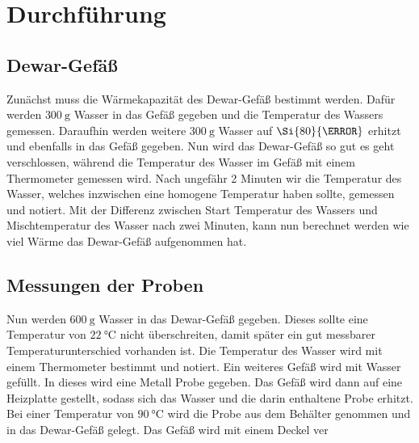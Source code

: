 \section{Durchführung}
\label{sec:Durchführung}

\subsection{Dewar-Gefäß}
Zunächst muss die Wärmekapazität des Dewar-Gefäß bestimmt werden.
Dafür werden $\SI{300}{\gram}$ Wasser in das Gefäß gegeben und die Temperatur des Wassers gemessen.
Daraufhin werden weitere $\SI{300}{\gram}$ Wasser auf $\Si{80}{\celsius}$ erhitzt und ebenfalls in das Gefäß gegeben.
Nun wird das Dewar-Gefäß so gut es geht verschlossen, während die Temperatur des Wasser im Gefäß mit einem Thermometer gemessen wird.
Nach ungefähr 2 Minuten wir die Temperatur des Wasser, welches inzwischen eine homogene Temperatur haben sollte, gemessen und notiert.
Mit der Differenz zwischen Start Temperatur des Wassers und Mischtemperatur des Wasser nach zwei Minuten, kann nun berechnet werden wie viel Wärme das Dewar-Gefäß aufgenommen hat.

\subsection{Messungen der Proben}
Nun werden $\SI{600}{\gram}$ Wasser in das Dewar-Gefäß gegeben.
Dieses sollte eine Temperatur von $\SI{22}{\celsius}$ nicht überschreiten, damit später ein gut messbarer Temperaturunterschied vorhanden ist.
Die Temperatur des Wasser wird mit einem Thermometer bestimmt und notiert.
Ein weiteres Gefäß wird mit Wasser gefüllt. 
In dieses wird eine Metall Probe gegeben.
Das Gefäß wird dann auf eine Heizplatte gestellt, sodass sich das Wasser und die darin enthaltene Probe erhitzt.
Bei einer Temperatur von $\SI{90}{\celsius}$ wird die Probe aus dem Behälter genommen und in das Dewar-Gefäß gelegt.
Das Gefäß wird mit einem Deckel ver